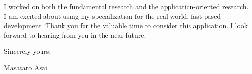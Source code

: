 \documentclass[12pt]{letter}
\begin{document}
I worked on both the fundamental research and the application-oriented
research. I am excited about using my specialization for the real
world, fast pased development.
Thank you for the valuable time to consider this application. I look forward to hearing from you in the near future.

Sincerely yours,

\begin{flushright}
 Masataro Asai
\end{flushright}
\end{document}
